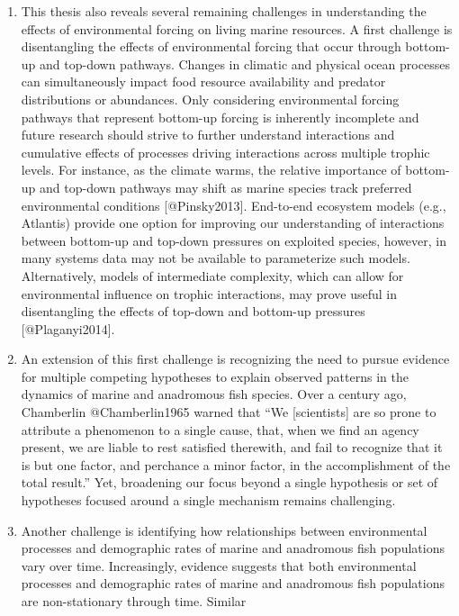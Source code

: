 \begin{enumerate}
\def\labelenumi{\arabic{enumi}.}
\setcounter{enumi}{2}
\item
  This thesis also reveals several remaining challenges in understanding
  the effects of environmental forcing on living marine resources. A
  first challenge is disentangling the effects of environmental forcing
  that occur through bottom-up and top-down pathways. Changes in
  climatic and physical ocean processes can simultaneously impact food
  resource availability and predator distributions or abundances. Only
  considering environmental forcing pathways that represent bottom-up
  forcing is inherently incomplete and future research should strive to
  further understand interactions and cumulative effects of processes
  driving interactions across multiple trophic levels. For instance, as
  the climate warms, the relative importance of bottom-up and top-down
  pathways may shift as marine species track preferred environmental
  conditions {[}@Pinsky2013{]}. End-to-end ecosystem models (e.g.,
  Atlantis) provide one option for improving our understanding of
  interactions between bottom-up and top-down pressures on exploited
  species, however, in many systems data may not be available to
  parameterize such models. Alternatively, models of intermediate
  complexity, which can allow for environmental influence on trophic
  interactions, may prove useful in disentangling the effects of
  top-down and bottom-up pressures {[}@Plaganyi2014{]}.
\item
  An extension of this first challenge is recognizing the need to pursue
  evidence for multiple competing hypotheses to explain observed
  patterns in the dynamics of marine and anadromous fish species. Over a
  century ago, Chamberlin @Chamberlin1965 warned that ``We
  {[}scientists{]} are so prone to attribute a phenomenon to a single
  cause, that, when we find an agency present, we are liable to rest
  satisfied therewith, and fail to recognize that it is but one factor,
  and perchance a minor factor, in the accomplishment of the total
  result.'' Yet, broadening our focus beyond a single hypothesis or set
  of hypotheses focused around a single mechanism remains challenging.
\item
  Another challenge is identifying how relationships between
  environmental processes and demographic rates of marine and anadromous
  fish populations vary over time. Increasingly, evidence suggests that
  both environmental processes and demographic rates of marine and
  anadromous fish populations are non-stationary through time. Similar

\end{enumerate}
